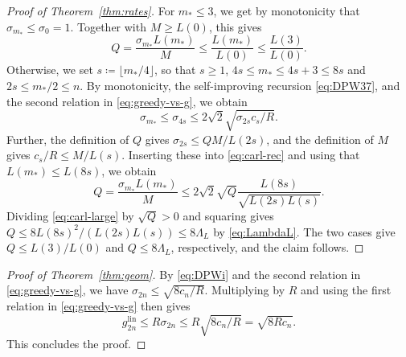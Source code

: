 \documentclass[11pt,reqno, a4paper]{article}
\numberwithin{equation}{section}
\newcommand{\lin}{\ensuremath{\mathrm{lin}}}
\begin{document}
\begin{proof}[Proof of Theorem~\ref{thm:rates}]
For $m_\ast\le3$, we get by monotonicity that $\sigma_{m_\ast}\le\sigma_0=1$.
Together with $M\ge L(0)$, this gives
\begin{equation}\label{eq:carl-small}
    Q=\frac{\sigma_{m_\ast}L(m_\ast)}{M} \le \frac{L(m_\ast)}{L(0)} \le \frac{L(3)}{L(0)}.
\end{equation}
Otherwise, we set $s\coloneqq\lfloor m_\ast/4\rfloor$, so that $s\ge1$, $4s\le m_\ast\le 4s+3\le 8s$ and $2s\le m_\ast/2\le n$.
By monotonicity, the self-improving recursion \eqref{eq:DPW37}, and the second relation in \eqref{eq:greedy-vs-g}, we obtain
\begin{equation}\label{eq:carl-rec}
    \sigma_{m_\ast}\le\sigma_{4s}\le 2\sqrt2 \sqrt{\sigma_{2s} c_s/R}.
\end{equation}
Further, the definition of $Q$ gives $\sigma_{2s}\le Q M/L(2s)$, and the definition of $M$ gives $c_s/R\le M/L(s)$.
Inserting these into \eqref{eq:carl-rec} and using that $L(m_\ast)\le L(8s)$, we obtain
\begin{equation}\label{eq:carl-large}
    Q=\frac{\sigma_{m_\ast}L(m_\ast)}{M} \le 2\sqrt2 \sqrt Q \frac{L(8s)}{\sqrt{L(2s)L(s)}} .
\end{equation}
Dividing \eqref{eq:carl-large} by $\sqrt Q>0$ and squaring gives $Q\le 8 L(8s)^2/(L(2s)L(s)) \leq 8\Lambda_L$ by \eqref{eq:LambdaL}.
The two cases give $Q\le L(3)/L(0)$ and $Q\le 8\Lambda_L$, respectively, and the claim follows.
\end{proof}
 
\begin{proof}[Proof of Theorem~\ref{thm:geom}]
By \eqref{eq:DPWi} and the second relation in \eqref{eq:greedy-vs-g}, we have $\sigma_{2n}\le  \sqrt{8c_n/R}$.
Multiplying by $R$ and using the first relation in \eqref{eq:greedy-vs-g} then gives
\begin{equation}
    g^{\lin}_{2n}\le R \sigma_{2n}\le R\sqrt{8c_n/R}= \sqrt{8R c_n}.
\end{equation}
This concludes the proof.
\end{proof}
\end{document}
